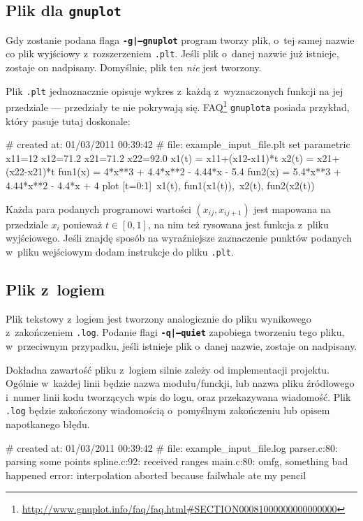 \documentclass[12pt,a4paper]{article}
\newcommand{\prog}[1]{\texttt{#1}}
\newcommand{\flag}[1]{\textbf{\prog{#1}}}
\begin{document}
\subsection{Plik dla \texttt{gnuplot}}
\label{sec:plik_gnuplot}

Gdy zostanie podana flaga \flag{-g|--gnuplot} program tworzy plik, o~tej samej
nazwie co plik wyjściowy z~rozszerzeniem \prog{.plt}. Jeśli plik o~danej nazwie
już istnieje, zostaje on nadpisany. Domyślnie, plik ten \emph{nie} jest
tworzony.

Plik \prog{.plt} jednoznacznie opisuje wykres z~każdą z~wyznaczonych funkcji
na jej przedziale --- przedziały te nie pokrywają się.
FAQ\footnote{\url{http://www.gnuplot.info/faq/faq.html\#SECTION00081000000000000000}}
\texttt{gnuplota} posiada przykład, który pasuje tutaj doskonale:
\vspace{-12pt}
\begin{SmallVerbatim}
    # created at: 01/03/2011 00:39:42
    #       file: example_input_file.plt
    set parametric
    x11=12
    x12=71.2
    x21=71.2
    x22=92.0
    x1(t) = x11+(x12-x11)*t
    x2(t) = x21+(x22-x21)*t
    fun1(x) = 4*x**3 + 4.4*x**2 - 4.44*x - 5.4
    fun2(x) = 5.4*x**3 + 4.44*x**2 - 4.4*x + 4
    plot [t=0:1]\
      x1(t), fun1(x1(t)),\
      x2(t), fun2(x2(t))
\end{SmallVerbatim}

Każda para podanych programowi wartości $(x_{ij}, x_{ij+1})$ jest mapowana na
przedziale $x_{i}$ ponieważ $t \in [0,1]$, na nim też rysowana jest funkcja
z~pliku wyjściowego. Jeśli znajdę sposób na wyraźniejsze zaznaczenie punktów
podanych w~pliku wejściowym dodam instrukcje do pliku \prog{.plt}.

\subsection{Plik z~logiem}
\label{sec:plik_log}

Plik tekstowy z~logiem jest tworzony analogicznie do pliku wynikowego
z~zakończeniem \prog{.log}. Podanie flagi \flag{-q|--quiet} zapobiega tworzeniu
tego pliku, w~przeciwnym przypadku, jeśli istnieje plik o~danej nazwie, zostaje
on nadpisany.

Dokładna zawartość pliku z~logiem silnie zależy od implementacji projektu.
Ogólnie w~każdej linii będzie nazwa modułu/funckji, lub nazwa pliku źródłowego
i~numer linii kodu tworzących wpis do logu, oraz przekazywana wiadomość. Plik
\prog{.log} będzie zakończony wiadomością o~pomyślnym zakończeniu lub opisem
napotkanego błędu.
\vspace{-12pt}
\begin{SmallVerbatim}
    # created at: 01/03/2011 00:39:42
    #       file: example_input_file.log
    parser.c:80: parsing some points
    spline.c:92: received ranges
    main.c:80: omfg, something bad happened
    error: interpolation aborted because failwhale ate my pencil
\end{SmallVerbatim}
\end{document}
